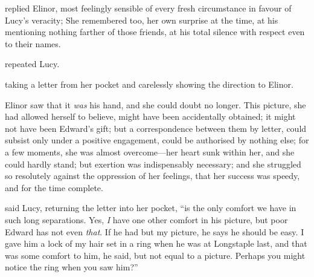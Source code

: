 

 replied Elinor, most feelingly sensible of every fresh circumstance in favour of Lucy's veracity;  She remembered too, her own surprise at the time, at his mentioning nothing farther of those friends, at his total silence with respect even to their names.

 repeated Lucy.


 taking a letter from her pocket and carelessly showing the direction to Elinor. 

Elinor saw that it {\em was} his hand, and she could doubt no longer. This picture, she had allowed herself to believe, might have been accidentally obtained; it might not have been Edward's gift; but a correspondence between them by letter, could subsist only under a positive engagement, could be authorised by nothing else; for a few moments, she was almost overcome---her heart sunk within her, and she could hardly stand; but exertion was indispensably necessary; and she struggled so resolutely against the oppression of her feelings, that her success was speedy, and for the time complete.

 said Lucy, returning the letter into her pocket, “is the only comfort we have in such long separations. Yes, {\em I} have one other comfort in his picture, but poor Edward has not even {\em that}. If he had but my picture, he says he should be easy. I gave him a lock of my hair set in a ring when he was at Longstaple last, and that was some comfort to him, he said, but not equal to a picture. Perhaps you might notice the ring when you saw him?”

